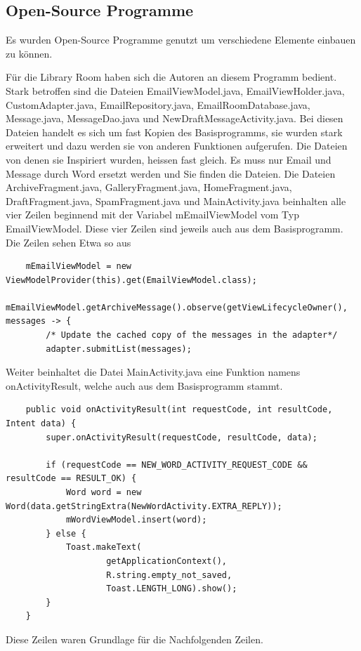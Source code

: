 \documentclass[a4paper,11pt]{article}
\begin{document}
\newpage
\printbibliography[heading=bibnumbered, title={Literaturverzeichnis}]

\newpage
\begin{appendices}
\subsection*{Open-Source Programme}
Es wurden Open-Source Programme genutzt um verschiedene Elemente einbauen zu können. 

Für die Library Room haben sich die Autoren an diesem Programm bedient. \cite{roomApp}
Stark betroffen sind die Dateien EmailViewModel.java, EmailViewHolder.java, CustomAdapter.java, EmailRepository.java, EmailRoomDatabase.java, Message.java, MessageDao.java
und NewDraftMessageActivity.java. Bei diesen
Dateien handelt es sich um fast Kopien des Basisprogramms, sie wurden stark erweitert und dazu werden sie von anderen Funktionen aufgerufen. 
Die Dateien von denen sie Inspiriert wurden, heissen fast gleich. Es muss nur Email und Message durch Word ersetzt werden und Sie finden die Dateien.
Die Dateien ArchiveFragment.java, GalleryFragment.java, HomeFragment.java, DraftFragment.java, SpamFragment.java und MainActivity.java beinhalten alle vier Zeilen beginnend mit der 
Variabel mEmailViewModel vom Typ EmailViewModel. Diese vier Zeilen sind jeweils auch aus dem Basisprogramm. 
Die Zeilen sehen Etwa so aus
\lstset{language=java}
\begin{lstlisting}
    mEmailViewModel = new ViewModelProvider(this).get(EmailViewModel.class);
    mEmailViewModel.getArchiveMessage().observe(getViewLifecycleOwner(), messages -> {
        /* Update the cached copy of the messages in the adapter*/
        adapter.submitList(messages);

\end{lstlisting}


Weiter beinhaltet die Datei MainActivity.java eine Funktion namens onActivityResult, welche auch aus dem Basisprogramm stammt. 
    \lstset{language=java}
    \begin{lstlisting}
    public void onActivityResult(int requestCode, int resultCode, Intent data) {
        super.onActivityResult(requestCode, resultCode, data);

        if (requestCode == NEW_WORD_ACTIVITY_REQUEST_CODE && resultCode == RESULT_OK) {
            Word word = new Word(data.getStringExtra(NewWordActivity.EXTRA_REPLY));
            mWordViewModel.insert(word);
        } else {
            Toast.makeText(
                    getApplicationContext(),
                    R.string.empty_not_saved,
                    Toast.LENGTH_LONG).show();
        }
    }
    \end{lstlisting}
Diese Zeilen waren Grundlage für die Nachfolgenden Zeilen.


\end{appendices}
\end{document}
